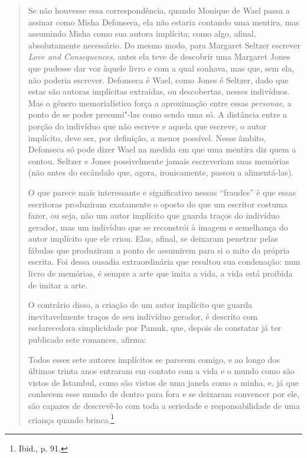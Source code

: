 \begin{quote}
Se não houvesse essa correspondência, quando Monique de Wael passa a
assinar como Misha Defonseca, ela não estaria contando uma mentira, mas
assumindo Misha como sua autora implícita; como algo, afinal,
absolutamente necessário. Do mesmo modo, para Margaret Seltzer escrever
\emph{Love and Consequences}, antes ela teve de descobrir uma Margaret
Jones que pudesse dar voz àquele livro e com a qual sonhava, mas que,
sem ela, não poderia escrever. Defonseca é Wael, como Jones é Seltzer,
dado que estas são autoras implícitas extraídas, ou descobertas, nesses
indivíduos. Mas o gênero memorialístico força a aproximação entre essas
\emph{personae}, a ponto de se poder presumi"-las como sendo uma só. A
distância entre a porção do indivíduo que não escreve e aquela que
escreve, o autor implícito, deve ser, por definição, a menor possível.
Nesse âmbito, Defonseca só pode dizer Wael na medida em que uma mentira
diz quem a contou. Seltzer e Jones possivelmente jamais escreveriam suas
memórias (não antes do escândalo que, agora, ironicamente, passou a
alimentá-las).

O que parece mais interessante e significativo nessas ``fraudes'' é que
essas escritoras produziram exatamente o oposto do que um escritor
costuma fazer, ou seja, não um autor implícito que guarda traços do
indivíduo gerador, mas um indivíduo que se reconstrói à imagem e
semelhança do autor implícito que ele criou. Elas, afinal, se deixaram
penetrar pelas fábulas que produziram a ponto de assumirem para si o
mito da própria escrita. Foi dessa ousadia extraordinária que resultou
sua condenação: num livro de memórias, é sempre a arte que imita a vida,
a vida está proibida de imitar a arte.

O contrário disso, a criação de um autor implícito que guarda
inevitavelmente traços de seu indivíduo gerador, é descrito com
esclarecedora simplicidade por Pamuk, que, depois de constatar já ter
publicado sete romances, afirma:

Todos esses sete autores implícitos se parecem comigo, e ao longo dos
últimos trinta anos entraram em contato com a vida e o mundo como são
vistos de Istambul, como são vistos de uma janela como a minha, e, já
que conhecem esse mundo de dentro para fora e se deixaram convencer por
ele, são capazes de descrevê-lo com toda a seriedade e responsabilidade
de uma criança quando brinca.\footnote{Ibid., p. 91.}


\end{quote}
